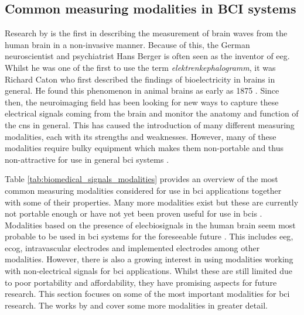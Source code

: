 
\subsection{Common measuring modalities in BCI systems}
\label{subsec:biomedical_signals_measuring_brain_modalities}

Research by \citet{human_eeg_discovery} is the first in describing the measurement of brain waves from the human brain in a non-invasive manner.
Because of this, the German neuroscientist and psychiatrist Hans Berger is often seen as the inventor of \gls{eeg}.
Whilst he was one of the first to use the term \textit{elektrenkephalogramm}, it was Richard Caton who first described the findings of bioelectricity in brains in general.
He found this phenomenon in animal brains as early as 1875 \citep{first_eeg}.
Since then, the neuroimaging field has been looking for new ways to capture these electrical signals coming from the brain and monitor the anatomy and function of the \gls{cns} in general.
This has caused the introduction of many different measuring modalities, each with its strengths and weaknesses.
However, many of these modalities require bulky equipment which makes them non-portable and thus non-attractive for use in general \gls{bci} systems \citep{modalities_review1}.

Table \ref{tab:biomedical_signals_modalities} provides an overview of the most common measuring modalities considered for use in \gls{bci} applications together with some of their properties.
Many more modalities exist but these are currently not portable enough or have not yet been proven useful for use in \glspl{bci} \citep{modalities_review1, modalities_review2}.
Modalities based on the presence of \glspl{elecbiosignal} in the human brain seem most probable to be used in \gls{bci} systems for the foreseeable future \citep{modalities_review2}.
This includes \gls{eeg}, \gls{ecog}, intravascular electrodes and implemented electrodes among other modalities.
However, there is also a growing interest in using modalities working with non-electrical signals for \gls{bci} applications.
Whilst these are still limited due to poor portability and affordability, they have promising aspects for future research.
This section focuses on some of the most important modalities for \gls{bci} research.
The works by \citet{modalities_review1} and \citet{modalities_review2} cover some more modalities in greater detail.


